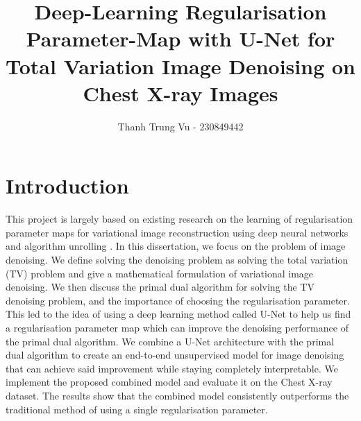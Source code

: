 \documentclass[12pt]{article}
\title{Deep-Learning Regularisation Parameter-Map with U-Net for Total Variation Image Denoising on Chest X-ray Images}
\author{Thanh Trung Vu - 230849442}
\makeatletter
\renewcommand{\maketitle}{
  \begin{center}
    {\Large \@title \par}      %
    {\large \@author \par}     %
  \end{center}
}
\makeatother
\begin{document}
\maketitle

\setlength\parskip{0.5em plus 0.1em minus 0.2em}












\section{Introduction}

This project is largely based on existing research 
on the learning of 
regularisation parameter maps for variational image reconstruction using deep neural networks and algorithm unrolling \cite{kofler2023learning}.
In this dissertation, we 
focus on the problem of image denoising.
We define solving the denoising problem as solving the total variation (TV) problem and give a mathematical formulation of variational image denoising. 
We then discuss the primal dual algorithm for solving the TV denoising problem, and the importance of choosing the regularisation parameter.
This led to the idea of using a deep learning method called U-Net to help us find a regularisation parameter map which can improve the denoising performance of the primal dual algorithm.
We combine a U-Net architecture with the primal dual algorithm to create an end-to-end unsupervised model for image denoising that can achieve said improvement while staying completely interpretable. 
We implement the proposed combined model and evaluate it on the Chest X-ray dataset.
The results show that the combined model consistently outperforms the traditional method of using a single regularisation parameter.
\end{document}
